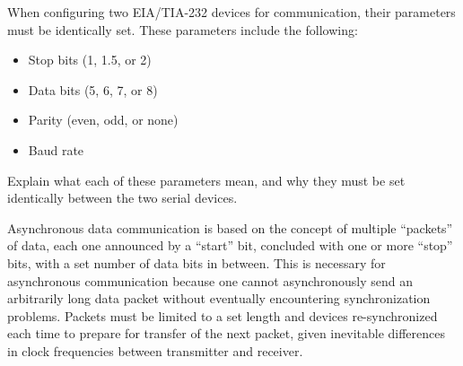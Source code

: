 

When configuring two EIA/TIA-232 devices for communication, their parameters must be identically set.  These parameters include the following:

\begin{itemize}
\item{} Stop bits (1, 1.5, or 2)
\item{} Data bits (5, 6, 7, or 8)
\item{} Parity (even, odd, or none)
\item{} Baud rate
\end{itemize}

Explain what each of these parameters mean, and why they must be set identically between the two serial devices.







Asynchronous data communication is based on the concept of multiple ``packets'' of data, each one announced by a ``start'' bit, concluded with one or more ``stop'' bits, with a set number of data bits in between.  This is necessary for asynchronous communication because one cannot asynchronously send an arbitrarily long data packet without eventually encountering synchronization problems.  Packets must be limited to a set length and devices re-synchronized each time to prepare for transfer of the next packet, given inevitable differences in clock frequencies between transmitter and receiver.











